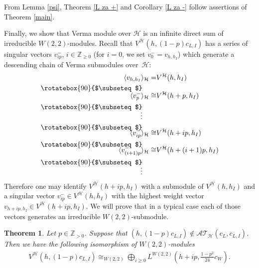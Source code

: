 \documentclass[pdftex]{sigma}
\numberwithin{equation}{section}
\newtheorem{Theorem}{Theorem}[section]
\newcommand{\N}{{\mathbb Z}_{> 0} }
\newcommand{\Z}{\mathbb Z}
\newcommand{\HVir}{\mathcal H}
\begin{document}
From Lemma \ref{psi}, Theorem \ref{L za +} and Corollary \ref{L za -} follow assertions of Theorem \ref{main}.

Finally, we show that Verma module over $\HVir$ is an inf\/inite direct sum of irreducible $W(2,2)$-modules. Recall that $V^{\HVir} ( h,(1-p) c_{L,I} )$ has a series of singular vectors $v_{ip}^-$, $i\in \Z_{\ge 0} $ (for $i= 0$, we set $v^-_0 = v_{h, h_I}$) which generate a descending chain of Verma submodules over~$\HVir$:
\begin{align*}
\langle v_{h,h_I} \rangle_{\HVir} =& V^{\HVir}(h,h_I) \\
\rotatebox{90}{$\subseteq$}\qquad & \\[-2mm]
\langle v_p^- \rangle_{\HVir} \cong& V^{\HVir}(h+p,h_I) \\
\rotatebox{90}{$\subseteq$}\qquad & \\[-3mm]
\vdots \qquad & \\
\rotatebox{90}{$\subseteq$}\qquad & \\[-3mm]
\langle v_{ip}^- \rangle_{\HVir} \cong& V^{\HVir}(h+ip,h_I) \\
\rotatebox{90}{$\subseteq$}\qquad & \\[-3mm]
\langle v_{(i+1)p}^- \rangle_{\HVir} \cong& V^{\HVir}(h+(i+1)p,h_I) \\
\rotatebox{90}{$\subseteq$}\qquad & \\[-3mm]
\vdots \qquad &
\end{align*}
Therefore one may identify $V^{\HVir}(h+ip,h_I)$ with a submodule of $V^{\HVir}(h,h_I) $ and a singular vector $v_{ip}^-\in V^{\HVir}(h,h_I)$ with the highest weight vector $v_{h+ip,h_I} \in V^{\HVir}(h+ip,h_I)$. We will prove that in a typical case each of those vectors generates an irreducible $W(2,2)$-submodule.

\begin{Theorem} \label{t37}
Let $p\in\N$. Suppose that $(h,(1-p) c_{L,I}) \notin {\mathcal {AT} }_{\HVir} (c_L, c_{L,I} )$.
Then we have the following isomorphism of $W(2,2)$-modules
\begin{gather*}
V^{\HVir}(h,(1-p) c_{L,I}) \cong_{W(2,2)}\bigoplus\limits_{i\geq0}L^{W( 2,2)}\left(h+ip,\frac{1-p^{2}}{24}c_{W}\right).
\end{gather*}
\end{Theorem}
\end{document}
